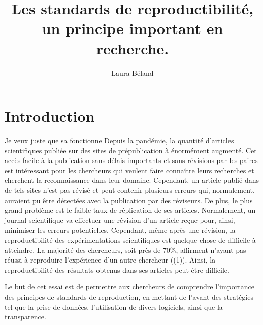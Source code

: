 \documentclass[9pt,twocolumn,twoside,]{pnas-new}
\title{Les standards de reproductibilité, un principe important en
recherche.}
\author[a]{Laura Béland}
\affil[a]{Université de Sherbrooke, Départment de biologie, 2500
Boulevard de l'Université, Sherbrooke, Québec, J1K 2R1}
\begin{document}
\verticaladjustment{-2pt}



\maketitle
\thispagestyle{firststyle}


\acknow{}

\hypertarget{introduction}{%
\section{Introduction}\label{introduction}}

Je veux juste que sa fonctionne Depuis la pandémie, la quantité
d'articles scientifiques publiée sur des sites de prépublication à
énormément augmenté. Cet accès facile à la publication sans délais
importants et sans révisions par les paires est intéressant pour les
chercheurs qui veulent faire connaître leurs recherches et cherchent la
reconnaissance dans leur domaine. Cependant, un article publié dans de
tels sites n'est pas révisé et peut contenir plusieurs erreurs qui,
normalement, auraient pu être détectées avec la publication par des
réviseurs. De plus, le plus grand problème est le faible taux de
réplication de ses articles. Normalement, un journal scientifique va
effectuer une révision d'un article reçue pour, ainsi, minimiser les
erreurs potentielles. Cependant, même après une révision, la
reproductibilité des expérimentations scientifiques est quelque chose de
difficile à atteindre. La majorité des chercheurs, soit près de 70\%,
affirment n'ayant pas réussi à reproduire l'expérience d'un autre
chercheur ((1)). Ainsi, la reproductibilité des résultats obtenus dans
ses articles peut être difficile.

Le but de cet essai est de permettre aux chercheurs de comprendre
l'importance des principes de standards de reproduction, en mettant de
l'avant des stratégies tel que la prise de données, l'utilisation de
divers logiciels, ainsi que la transparence.
\end{document}
